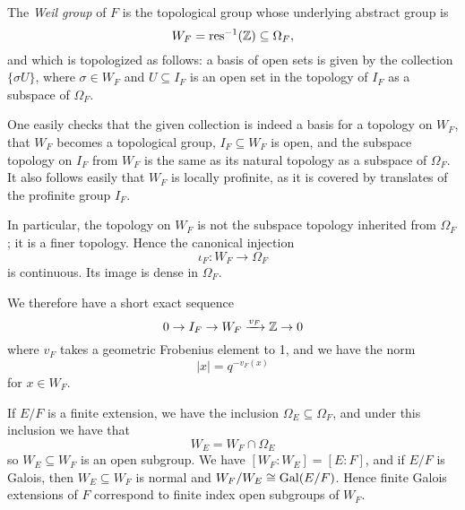 \begin{defn}
	The \emph{Weil group} of $F$ is the topological group whose underlying abstract group is 
	\[W_F = \text{res}^{-1}(\mathbb{Z})\subseteq \Omega_F,\]
	and which is topologized as follows: a basis of open sets is given by the collection $\{\sigma U\}$, where $\sigma \in W_F$ and $U\subseteq I_F$ is an open set in the topology of $I_F$ as a subspace of $\Omega_F$.
\end{defn}
One easily checks that the given collection is indeed a basis for a topology on $W_F$, that $W_F$ becomes a topological group, $I_F\subseteq W_F$ is open, and the subspace topology on $I_F$ from $W_F$ is the same as its natural topology as a subspace of $\Omega_F$. It also follows easily that $W_F$ is locally profinite, as it is covered by translates of the profinite group $I_F$.

In particular, the topology on $W_F$ is not the subspace topology inherited from $\Omega_F$; it is a finer topology. Hence the canonical injection
\[\iota_F: W_F\to \Omega_F\]
is continuous. Its image is dense in $\Omega_F$.

 We therefore have a short exact sequence
\[0 \to I_F \to W_F \xrightarrow{v_F} \mathbb{Z}\to 0\]
where $v_F$ takes a geometric Frobenius element to 1, and we have the norm
\[|x| = q^{-v_F(x)}\]
for $x\in W_F$. 

If $E/F$ is a finite extension, we have the inclusion $\Omega_E\subseteq \Omega_F$, and under this inclusion we have that 
\[W_E = W_F \cap \Omega_E\]
so $W_E\subseteq W_F$ is an open subgroup. We have $[W_F:W_E] = [E:F]$, and if $E/F$ is Galois, then $W_E\subseteq W_F$ is normal and $W_F/W_E\cong \mathrm{Gal}(E/F)$. Hence finite Galois extensions of $F$ correspond to finite index open subgroups of $W_F$.

